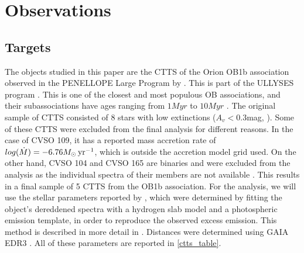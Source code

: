 \documentclass[twocolumn,linenumbers]{aastex631}
\newcommand{\msunyr}{M_{\sun} \, \rm{ yr^{-1}}}
\begin{document}
\section{Observations} \label{Sample and observations}

\subsection{Targets}
The objects studied in this paper are the CTTS of the Orion OB1b association observed in the PENELLOPE Large Program by \citep{manara2021}. This is part of the ULLYSES program \citep{roman-duval2020}. This is one of the closest and most populous OB associations, and their subassociations have ages ranging from $1Myr$ to $10Myr$ \citep{blaauw1994}. The original sample of CTTS consisted of 8 stars with low extinctions ($A_v < 0.3$mag, \citet{briceno2019}). Some of these CTTS were excluded from the final analysis for different reasons. In the case of CVSO 109, it has a reported mass accretion rate of $log(\dot{M})= -6.76\msunyr$, which is outside the accretion model grid used. On the other hand, CVSO 104 and CVSO 165 are binaries and were excluded from the analysis as the individual spectra of their members are not available \citep{manara2021a}. This results in a final sample of 5 CTTS from the OB1b association. For the analysis, we will use the stellar parameters reported by \citet{manara2021}, which were determined by fitting the object's dereddened spectra with a hydrogen slab model and a photospheric emission template, in order to reproduce the observed excess emission. This method is described in more detail in \citep{manara2013a}. Distances were determined using GAIA EDR3 \citep{gaia2016,gaia2021}. All of these parameters are reported in \ref{ctts_table}. 
\end{document}
